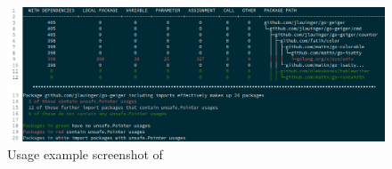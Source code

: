 \begin{figure}[tp!]
    \centering
    \includegraphics[width=\textwidth]{assets/images/chapter4/go-geiger-screenshot.png}
    \caption{Usage example screenshot of \toolGeiger{}}
    \label{fig:go-geiger-screenshot}
\end{figure}
